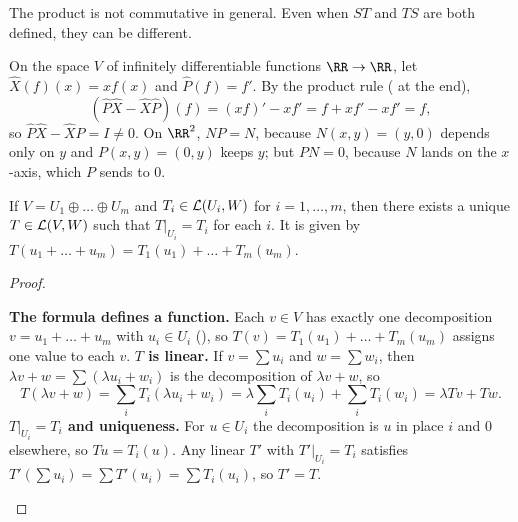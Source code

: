 \documentclass[10pt]{scrartcl}
\begin{document}
The product is not commutative in general. Even when $ST$ and $TS$ are both defined, they can be different.

\begin{example*}
  On the space $V$ of infinitely differentiable functions $\RR\to\RR$, let $\hat X(f)(x)=xf(x)$ and $\hat P(f)=f'$. By the product rule ( at the end),
  \[
    (\hat P\hat X-\hat X\hat P)(f)=(xf)'-xf'=f+xf'-xf'=f,
  \]
  so $\hat P\hat X-\hat X\hat P=I\ne0$. On $\RR^2$, $NP=N$, because $N(x,y)=(y,0)$ depends only on $y$ and $P(x,y)=(0,y)$ keeps $y$; but $PN=0$, because $N$ lands on the $x$-axis, which $P$ sends to $0$.
\end{example*}

\begin{proposition*}
  If $V=U_1\oplus\dots\oplus U_m$ and $T_i\in\mathcal L(U_i,W)$ for $i=1,\dots,m$, then there exists a unique $T\in\mathcal L(V,W)$ such that $T|_{U_i}=T_i$ for each $i$. It is given by $T(u_1+\dots+u_m)=T_1(u_1)+\dots+T_m(u_m)$.
\end{proposition*}
\begin{proof}
  \begin{steps}
    \ii \textbf{The formula defines a function.} Each $v\in V$ has exactly one decomposition $v=u_1+\dots+u_m$ with $u_i\in U_i$ (), so $T(v)=T_1(u_1)+\dots+T_m(u_m)$ assigns one value to each $v$.
    \ii \textbf{$T$ is linear.} If $v=\sum u_i$ and $w=\sum w_i$, then $\lambda v+w=\sum(\lambda u_i+w_i)$ is the decomposition of $\lambda v+w$, so
    \[
      T(\lambda v+w)=\sum_iT_i(\lambda u_i+w_i)=\lambda\sum_iT_i(u_i)+\sum_iT_i(w_i)=\lambda Tv+Tw.
    \]
    \ii \textbf{$T|_{U_i}=T_i$ and uniqueness.} For $u\in U_i$ the decomposition is $u$ in place $i$ and $0$ elsewhere, so $Tu=T_i(u)$. Any linear $T'$ with $T'|_{U_i}=T_i$ satisfies $T'(\sum u_i)=\sum T'(u_i)=\sum T_i(u_i)$, so $T'=T$.
  \end{steps}
\end{proof}
\end{document}
